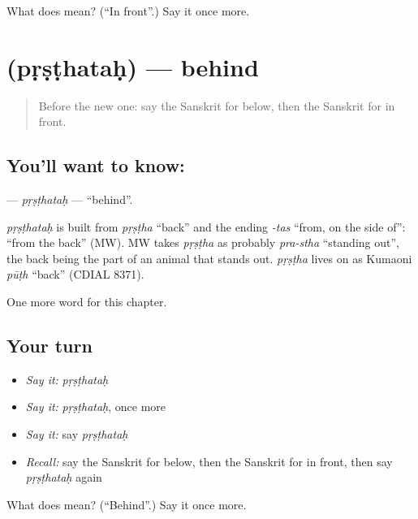 \begin{tcolorbox}[breakable,colback=teal!4,colframe=teal!35!black,title={Before you move on}]
What does  mean? (\textquotedblleft{}In front\textquotedblright{}.) Say it once more.
\end{tcolorbox}
\section[\texorpdfstring{\sk{पृष्ठतः} (pṛṣṭhataḥ)}{पृष्ठतः (pṛṣṭhataḥ)}]{ (pṛṣṭhataḥ) — behind}

\label{lesson:SA-C94-prsthatah}



\begin{quote}
Before the new one: say the Sanskrit for below, then the Sanskrit for in front.
\end{quote}

\subsection*{You'll want to know: }
\textbf{} — \emph{pṛṣṭhataḥ} — \textquotedblleft{}behind\textquotedblright{}.

\begin{cousinweb}
\emph{pṛṣṭhataḥ} is built from \emph{pṛṣṭha} \textquotedblleft{}back\textquotedblright{} and the ending \emph{-tas} \textquotedblleft{}from, on the side of\textquotedblright{}: \textquotedblleft{}from the back\textquotedblright{} (MW). MW takes \emph{pṛṣṭha} as probably \emph{pra-stha} \textquotedblleft{}standing out\textquotedblright{}, the back being the part of an animal that stands out. \emph{pṛṣṭha} lives on as Kumaoni \emph{pūṭh} \textquotedblleft{}back\textquotedblright{} (CDIAL 8371).
\end{cousinweb}

\begin{grammarlens}[title={What you've built}]
One more word for this chapter.
\end{grammarlens}

\subsection*{Your turn}
\begin{itemize}
\raggedright
  \item \emph{Say it:} \emph{pṛṣṭhataḥ}
  \item \emph{Say it:} \emph{pṛṣṭhataḥ}, once more
  \item \emph{Say it:} say \emph{pṛṣṭhataḥ}
  \item \emph{Recall:} say the Sanskrit for below, then the Sanskrit for in front, then say \emph{pṛṣṭhataḥ} again
\end{itemize}

\begin{tcolorbox}[breakable,colback=teal!4,colframe=teal!35!black,title={Before you move on}]
What does  mean? (\textquotedblleft{}Behind\textquotedblright{}.) Say it once more.
\end{tcolorbox}
